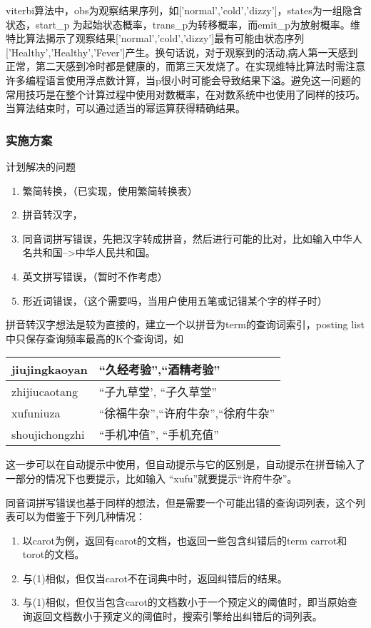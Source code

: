 \par viterbi算法中，obs为观察结果序列，如['normal','cold','dizzy']，states为一组隐含状态，start\_p 为起始状态概率，trans\_p为转移概率，而emit\_p为放射概率。维特比算法揭示了观察结果['normal','cold','dizzy']最有可能由状态序列['Healthy','Healthy','Fever']产生。换句话说，对于观察到的活动,病人第一天感到正常，第二天感到冷时都是健康的，而第三天发烧了。在实现维特比算法时需注意许多编程语言使用浮点数计算，当p很小时可能会导致结果下溢。避免这一问题的常用技巧是在整个计算过程中使用对数概率，在对数系统中也使用了同样的技巧。当算法结束时，可以通过适当的幂运算获得精确结果。
\subsubsection{实施方案}
\par 计划解决的问题
\begin{enumerate}
\item 繁简转换，（已实现，使用繁简转换表）
\item 拼音转汉字，
\item 同音词拼写错误，先把汉字转成拼音，然后进行可能的比对，比如输入中华人名共和国-->中华人民共和国。
\item 英文拼写错误，（暂时不作考虑）
\item 形近词错误，（这个需要吗，当用户使用五笔或记错某个字的样子时）
\end{enumerate}
\par 拼音转汉字想法是较为直接的，建立一个以拼音为term的查询词索引，posting list中只保存查询频率最高的K个查询词，如
\begin{table}[h]
  \centering
  \begin{tabular}{|l|l|}
\hline
jiujingkaoyan &“久经考验”,“酒精考验”\\ \hline
zhijiucaotang & “子九草堂', “子久草堂” \\ \hline
xufuniuza & “徐福牛杂”,“许府牛杂”,“徐府牛杂”\\ \hline
shoujichongzhi&“手机冲值”, “手机充值”\\ \hline
  \end{tabular}
\end{table}
\par 这一步可以在自动提示中使用，但自动提示与它的区别是，自动提示在拼音输入了一部分的情况下也要提示，比如输入 “xufu”就要提示“许府牛杂”。
\par 同音词拼写错误也基于同样的想法，但是需要一个可能出错的查询词列表，这个列表可以为借鉴于下列几种情况：
\begin{enumerate}[(1)]
\item 以carot为例，返回有carot的文档，也返回一些包含纠错后的term carrot和torot的文档。
\item 与(1)相似，但仅当carot不在词典中时，返回纠错后的结果。
\item 与(1)相似，但仅当包含carot的文档数小于一个预定义的阈值时，即当原始查询返回文档数小于预定义的阈值时，搜索引擎给出纠错后的词列表。
\end{enumerate}
